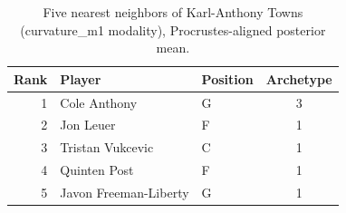 \begin{table}[htbp]
  \centering\small
  \begin{tabular}{rllc}
    \toprule
    Rank & Player & Position & Archetype \\
    \midrule
    1 & Cole Anthony & G & 3 \\
    2 & Jon Leuer & F & 1 \\
    3 & Tristan Vukcevic & C & 1 \\
    4 & Quinten Post & F & 1 \\
    5 & Javon Freeman-Liberty & G & 1 \\
    \bottomrule
  \end{tabular}
  \caption{Five nearest neighbors of Karl-Anthony Towns (curvature_m1 modality), Procrustes-aligned posterior mean.}
  \label{tab:Karl_Anthony_Towns_neighbors_curvature_m1}
\end{table}

